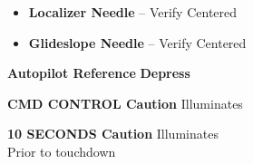\begin{tablenumerate}
{\begin{subenumerate}
        \begin{itemize}
            \item \textbf{Localizer Needle} -- Verify Centered
            \item \textbf{Glideslope Needle} -- Verify Centered
        \end{itemize}
        \item \textbf{Autopilot Reference} \dotfill \textbf{Depress}
        \item \textbf{CMD CONTROL Caution} \dotfill Illuminates
        \item \textbf{10 SECONDS Caution} \dotfill Illuminates \\
        \hfill Prior to touchdown
    \end{subenumerate}}
\end{tablenumerate}


